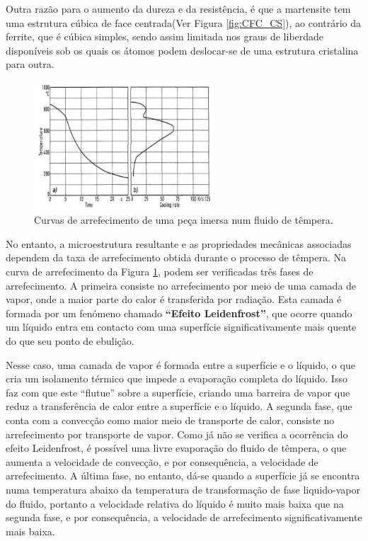 \par
Outra razão para o aumento da dureza e da resistência, é que a martensite tem uma estrutura cúbica de face centrada(Ver Figura \ref{fig:CFC_CS}), ao contrário da ferrite, que é cúbica simples, sendo assim limitada nos graus de liberdade disponíveis sob os quais os átomos podem deslocar-se de uma estrutura cristalina para outra.
\begin{figure}[htb]
    \centering
    \includegraphics[width = 0.6\textwidth]{Figures/Cap2/Tempera_Arrefecimento.png}
    \caption[Curva de arrefecimento em fluido de têmpera]%
    {Curvas de arrefecimento de uma peça imersa num fluido de têmpera.}
    \label{fig:tempera_arref}
\end{figure}
\par
No entanto, a microestrutura resultante e as propriedades mecânicas associadas dependem da taxa de arrefecimento obtida durante o processo de têmpera. Na curva de arrefecimento da Figura \ref{fig:tempera_arref}, podem ser verificadas três fases de arrefecimento. A primeira consiste no arrefecimento por meio de uma camada de vapor, onde a maior parte do calor é transferida por radiação. Esta camada é formada por um fenómeno chamado \textbf{“Efeito Leidenfrost”}, que ocorre quando um líquido entra em contacto com uma superfície significativamente mais quente do que seu ponto de ebulição. 
\newpage
\par
Nesse caso, uma camada de vapor é formada entre a superfície e o líquido, o que cria um isolamento térmico que impede a evaporação completa do líquido. Isso faz com que este “flutue” sobre a superfície, criando uma barreira de vapor que reduz a transferência de calor entre a superfície e o líquido. A segunda fase, que conta com a convecção como maior meio de transporte de calor, consiste no arrefecimento por transporte de vapor. Como já não se verifica a ocorrência do efeito Leidenfrost, é possível uma livre evaporação do fluido de têmpera, o que aumenta a velocidade de convecção, e por consequência, a velocidade de arrefecimento. A última fase, no entanto, dá-se quando a superfície já se encontra numa temperatura abaixo da temperatura de transformação de fase liquido-vapor do fluido, portanto a velocidade relativa do líquido é muito mais baixa que na segunda fase, e por consequência, a velocidade de arrefecimento significativamente mais baixa.


